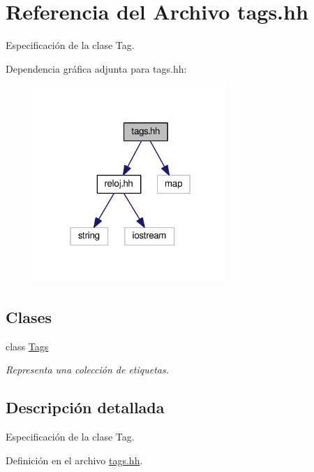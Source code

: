 \hypertarget{tags_8hh}{\section{Referencia del Archivo tags.\-hh}
\label{tags_8hh}
}


Especificación de la clase Tag.  


Dependencia gráfica adjunta para tags.\-hh\-:
\nopagebreak
\begin{figure}[H]
\begin{center}
\leavevmode
\includegraphics[width=208pt]{tags_8hh__incl}
\end{center}
\end{figure}
\subsection*{Clases}
\begin{DoxyCompactItemize}
\item 
class \hyperlink{class_tags}{Tags}
\begin{DoxyCompactList}\small\item\em Representa una colección de etiquetas. \end{DoxyCompactList}\end{DoxyCompactItemize}


\subsection{Descripción detallada}
Especificación de la clase Tag. 

Definición en el archivo \hyperlink{tags_8hh_source}{tags.\-hh}.

